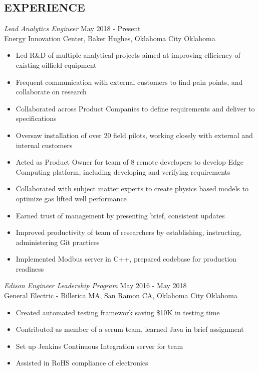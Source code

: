 \documentclass[line,margin]{res}
\begin{document}
\begin{resume}
	\section{EXPERIENCE}
	 {\sl Lead Analytics Engineer} \hfill May 2018 - Present \\
	Energy Innovation Center, Baker Hughes, Oklahoma City Oklahoma
	\begin{itemize} \itemsep -2pt
		\item Led R\&D of multiple analytical projects aimed at improving efficiency of existing oilfield equipment
		\item Frequent communication with external customers to find pain points, and collaborate on research
		\item Collaborated across Product Companies to define requirements and deliver to specifications
		\item Oversaw installation of over 20 field pilots, working closely with external and internal customers
		\item Acted as Product Owner for team of 8 remote developers to develop Edge Computing platform, including developing and verifying requirements
		\item Collaborated with subject matter experts to create physics based models to optimize gas lifted well performance
		\item Earned trust of management by presenting brief, consistent updates
		\item Improved productivity of team of researchers by establishing, instructing, administering Git practices
		\item Implemented Modbus server in C++, prepared codebase for production readiness
	\end{itemize}
	{\sl Edison Engineer Leadership Program} \hfill May 2016 - May 2018\\
	General Electric - Billerica MA, San Ramon CA, Oklahoma City Oklahoma
	\begin{itemize} \itemsep -2pt
		\item Created automated testing framework saving \$10K in testing time
		\item Contributed as member of a scrum team, learned Java in brief assignment
		\item Set up Jenkins Continuous Integration server for team
		\item Assisted in RoHS compliance of electronics
	\end{itemize}


\end{resume}
\end{document}
